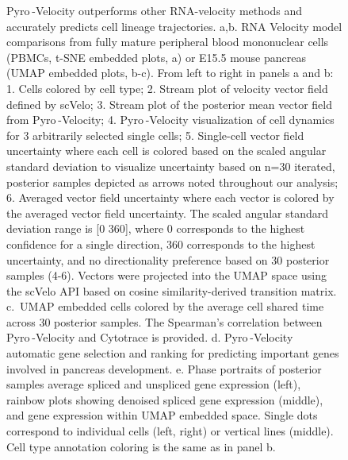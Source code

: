 \documentclass[
  sn-mathphys-num,
  lineno,
  twocolumn]{sn-jnl}
\begin{document}
\begin{figure}


\caption{\label{fig-model-results}Pyro -Velocity outperforms other
RNA-velocity methods and accurately predicts cell lineage trajectories.
a,b. RNA Velocity model comparisons from fully mature peripheral blood
mononuclear cells (PBMCs, t-SNE embedded plots, a) or E15.5 mouse
pancreas (UMAP embedded plots, b-c). From left to right in panels a and
b: 1. Cells colored by cell type; 2. Stream plot of velocity vector
field defined by scVelo; 3. Stream plot of the posterior mean vector
field from Pyro -Velocity; 4. Pyro -Velocity visualization of cell
dynamics for 3 arbitrarily selected single cells; 5. Single-cell vector
field uncertainty where each cell is colored based on the scaled angular
standard deviation to visualize uncertainty based on n=30 iterated,
posterior samples depicted as arrows noted throughout our analysis; 6.
Averaged vector field uncertainty where each vector is colored by the
averaged vector field uncertainty. The scaled angular standard deviation
range is {[}0 360{]}, where 0 corresponds to the highest confidence for
a single direction, 360 corresponds to the highest uncertainty, and no
directionality preference based on 30 posterior samples (4-6). Vectors
were projected into the UMAP space using the scVelo API based on cosine
similarity-derived transition matrix. c.~UMAP embedded cells colored by
the average cell shared time across 30 posterior samples. The Spearman's
correlation between Pyro -Velocity and Cytotrace is provided. d.
Pyro -Velocity automatic gene selection and ranking for predicting
important genes involved in pancreas development. e. Phase portraits of
posterior samples average spliced and unspliced gene expression (left),
rainbow plots showing denoised spliced gene expression (middle), and
gene expression within UMAP embedded space. Single dots correspond to
individual cells (left, right) or vertical lines (middle). Cell type
annotation coloring is the same as in panel b.}

\end{figure}%
\end{document}
